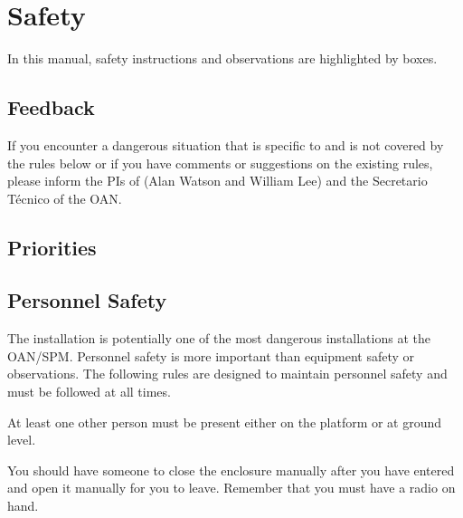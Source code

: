 \chapter{Safety}
\label{chapter:safety}


In this manual, safety instructions and observations are highlighted by boxes.
\section{Feedback}

If you encounter a dangerous situation that is specific to {\projectname} and is not covered by the rules below or if you have comments or suggestions on the existing rules, please inform the PIs of {\projectname} (Alan Watson and William Lee) and the Secretario Técnico of the OAN.

\section{Priorities}


\section{Personnel Safety}

The {\projectname} installation is potentially one of the most dangerous installations at the OAN/SPM. Personnel safety is more important than equipment safety or observations. The following  rules are designed to maintain personnel safety and must be followed at all times.


At least one other person must be present either on the platform or at ground level.


You should have someone to close the enclosure manually after you have entered and open it manually for you to leave. Remember that you must have a radio on hand.

